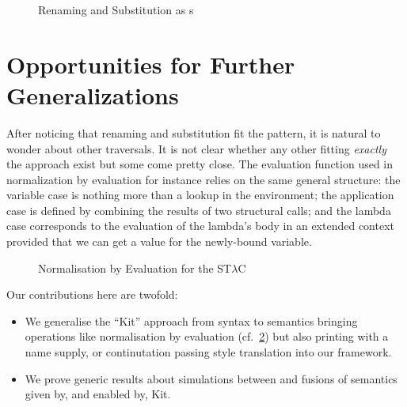 \begin{figure}[h]
\begin{minipage}{0.5\textwidth}
\end{minipage}
\begin{minipage}{0.5\textwidth}
\end{minipage}
\caption{Renaming and Substitution as s\label{rensubkits}}
\end{figure}

\section{Opportunities for Further Generalizations}

After noticing that renaming and substitution fit the pattern, it is
natural to wonder about other traversals. It is not clear whether any
other fitting \emph{exactly} the  approach exist but some come
pretty close. The evaluation function used in normalization by evaluation
for instance relies on the same general structure: the variable case is
nothing more than a lookup in the environment; the application case is
defined by combining the results of two structural calls; and the lambda
case corresponds to the evaluation of the lambda's body in an extended
context provided that we can get a value for the newly-bound variable.

\begin{figure}[h]
\caption{Normalisation by Evaluation for the ST$λ$C\label{nbe}}
\end{figure}

Our contributions here are twofold:
\begin{itemize}
  \item
    We generalise the ``Kit'' approach from syntax to semantics bringing
    operations like normalisation by evaluation (cf.~\cref{nbe}) but also
    printing with a name supply, or continutation passing style translation
    into our framework.

  \item
    We prove generic results about simulations between and fusions of
    semantics given by, and enabled by, Kit.
\end{itemize}

